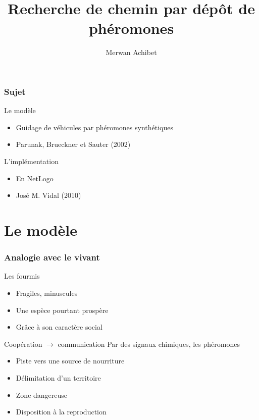 \documentclass{beamer}
\title{Recherche de chemin par dépôt de phéromones}
\author{Merwan Achibet}
\institute{Université du Havre}
\date{}
\begin{document}
\maketitle

\begin{frame}

  \frametitle{Sujet}

  \begin{block}{Le modèle}
    \begin{itemize}
    \item{Guidage de véhicules par phéromones synthétiques}
    \item{Parunak, Brueckner et Sauter (2002)}
    \end{itemize}
  \end{block}

  \vfill

  \begin{block}{L'implémentation}
    \begin{itemize}
    \item{En NetLogo}
    \item{José M. Vidal (2010)}
    \end{itemize}
  \end{block}

\end{frame}

\section{Le modèle}

\begin{frame}

  \frametitle{Analogie avec le vivant}

  \begin{block}{Les fourmis}
    \begin{itemize}
    \item{Fragiles, minuscules}
    \item{Une espèce pourtant prospère}
    \item{Grâce à son caractère social}
    \end{itemize}
  \end{block}

  \vfill

  \begin{block}{Coopération $\rightarrow$ communication}
    Par des signaux chimiques, les phéromones
    \begin{itemize}
      \item{Piste vers une source de nourriture}
      \item{Délimitation d'un territoire}
      \item{Zone dangereuse}
      \item{Disposition à la reproduction}
    \end{itemize}
  \end{block}

\end{frame}
\end{document}
